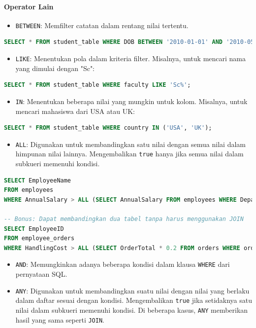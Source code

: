 \documentclass{article}
\begin{document}
\paragraph{Operator Lain}
\begin{itemize}
    \item \texttt{BETWEEN}: Memfilter catatan dalam rentang nilai tertentu.
\end{itemize}
\begin{lstlisting}[language=SQL, caption={Contoh Operator BETWEEN}, captionpos=b]
SELECT * FROM student_table WHERE DOB BETWEEN '2010-01-01' AND '2010-05-30';
\end{lstlisting}
\begin{itemize}
    \item \texttt{LIKE}: Menentukan pola dalam kriteria filter. Misalnya, untuk mencari nama yang dimulai dengan "Sc":
\end{itemize}
\begin{lstlisting}[language=SQL, caption={Contoh Operator LIKE}, captionpos=b]
SELECT * FROM student_table WHERE faculty LIKE 'Sc%';
\end{lstlisting}
\begin{itemize}
    \item \texttt{IN}: Menentukan beberapa nilai yang mungkin untuk kolom. Misalnya, untuk mencari mahasiswa dari USA atau UK:
\end{itemize}
\begin{lstlisting}[language=SQL, caption={Contoh Operator IN}, captionpos=b]
SELECT * FROM student_table WHERE country IN ('USA', 'UK');
\end{lstlisting}
\begin{itemize}
    \item \texttt{ALL}: Digunakan untuk membandingkan satu nilai dengan semua nilai dalam himpunan nilai lainnya. Mengembalikan \texttt{true} hanya jika semua nilai dalam subkueri memenuhi kondisi.
\end{itemize}
\begin{lstlisting}[language=SQL, caption={Contoh Operator ALL}, captionpos=b]
SELECT EmployeeName  
FROM employees  
WHERE AnnualSalary > ALL (SELECT AnnualSalary FROM employees WHERE Department = 'Finance');

-- Bonus: Dapat membandingkan dua tabel tanpa harus menggunakan JOIN
SELECT EmployeeID  
FROM employee_orders  
WHERE HandlingCost > ALL (SELECT OrderTotal * 0.2 FROM orders WHERE orders.OrderID = employee_orders.OrderID);
\end{lstlisting}
\begin{itemize}
    \item \texttt{AND}: Memungkinkan adanya beberapa kondisi dalam klausa \texttt{WHERE} dari pernyataan SQL.
    \item \texttt{ANY}: Digunakan untuk membandingkan suatu nilai dengan nilai yang berlaku dalam daftar sesuai dengan kondisi. Mengembalikan \texttt{true} jika setidaknya satu nilai dalam subkueri memenuhi kondisi. Di beberapa kasus, \texttt{ANY} memberikan hasil yang sama seperti \texttt{JOIN}.
\end{itemize}
\end{document}
